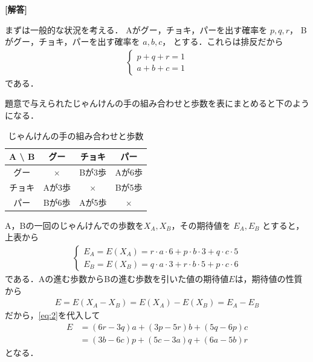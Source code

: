 \documentclass[../../main.tex]{subfiles}
\begin{document}
\begin{oframed}
  
\end{oframed}

{\bf [解答]}

まずは一般的な状況を考える．
Aがグー，チョキ，パーを出す確率を $p, q, r$，
Bがグー，チョキ，パーを出す確率を $a, b, c$，
とする．これらは排反だから
\begin{align}
  \begin{cases}
    p + q + r = 1 \\
    a + b + c = 1
  \end{cases} \label{eq:1}
\end{align}
である．

題意で与えられたじゃんけんの手の組み合わせと歩数を表にまとめると下のようになる．

\begin{table}[htb]
  \centering
  \caption{じゃんけんの手の組み合わせと歩数}
  \begin{tabular}{|c|c|c|c|}
    \hline
    A \textbackslash{} B & グー & チョキ & パー \\ \hline
    グー & $\times$ & Bが3歩 & Aが6歩 \\ \hline
    チョキ & Aが3歩 & $\times$ & Bが5歩 \\ \hline
    パー & Bが6歩 & Aが5歩 & $\times$ \\ \hline
  \end{tabular}
\end{table}

A，Bの一回のじゃんけんでの歩数を$X_A,X_B$，その期待値を $E_A, E_B$ とすると，上表から
\begin{align}
  \begin{cases}
    E_A = E(X_A) = r \cdot a \cdot 6 + p \cdot b \cdot 3 + q \cdot c \cdot 5 \\
    E_B = E(X_B) = q \cdot a \cdot 3 + r \cdot b \cdot 5 + p \cdot c \cdot 6
  \end{cases} \label{eq:2}
\end{align}
である．Aの進む歩数からBの進む歩数を引いた値の期待値$E$は，期待値の性質から
\begin{align}
  E = E(X_A-X_B) = E(X_A) -E(X_B) = E_A-E_B
\end{align}
だから，\cref{eq:2}を代入して
\begin{align}
  E
  &= (6r - 3q) a + (3p - 5r) b + (5q - 6p) c \label{eq:3} \\
  &= (3b - 6c) p + (5c - 3a) q + (6a - 5b) r \label{eq:4}
\end{align}
となる．
\end{document}
